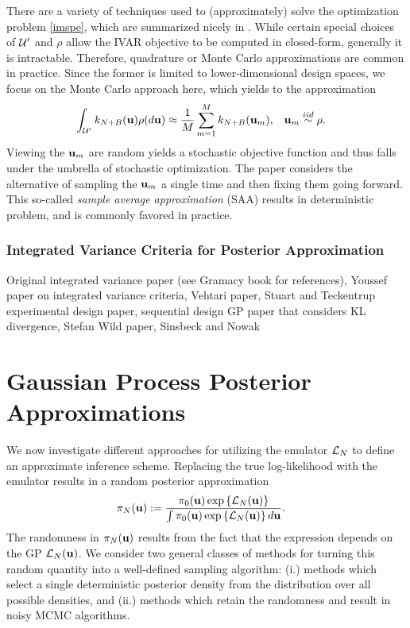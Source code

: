 \documentclass[12pt]{article}
\begin{document}
There are a variety of techniques used to (approximately) solve the optimization problem \ref{imspe}, which are summarized nicely in \cite{Mercer_kernels_IVAR}.
While certain special choices of $\parSpace^\prime$ and $\rho$ allow the IVAR objective to be computed in closed-form, generally it is intractable. Therefore, 
quadrature or Monte Carlo approximations are common in practice. Since the former is limited to lower-dimensional design spaces, we focus on the Monte 
Carlo approach here, which yields to the approximation 
\begin{align}
 \int_{\parSpace^\prime}  \GPKerPred[\Ndesign + \Nbatch](\bpar) \rho(d\bpar) &\approx \frac{1}{M} \sum_{m=1}^{M} \GPKerPred[\Ndesign + \Nbatch](\bpar_m), &&\bpar_m \overset{iid}{\sim} \rho.
\end{align}
Viewing the $\bpar_m$ are random yields a stochastic objective function and thus falls under the umbrella of stochastic optimization. The paper \cite{Mercer_kernels_IVAR} 
considers the alternative of sampling the $\bpar_m$ a single time and then fixing them going forward. This so-called \textit{sample average approximation} (SAA) results 
in deterministic problem, and is commonly favored in practice. 



\subsubsection{Integrated Variance Criteria for Posterior Approximation}


Original integrated variance paper (see Gramacy book for references), Youssef paper on integrated variance criteria, Vehtari paper, Stuart and Teckentrup experimental 
design paper, sequential design GP paper that considers KL divergence, Stefan Wild paper, Sinsbeck and Nowak 

\section{Gaussian Process Posterior Approximations}
We now investigate different approaches for utilizing the emulator $\llik_{\Ndesign}$ to define an approximate inference scheme. Replacing the true log-likelihood 
with the emulator results in a random posterior approximation 
\begin{align}
\postDens_{\Ndesign}(\bpar)
&:= \frac{\priorDens(\bpar) \exp\left\{\llik_{\Ndesign}(\bpar) \right\}}{\int \priorDens(\bpar) \exp\left\{\llik_{\Ndesign}(\bpar) \right\} d\bpar}.
\end{align}
The randomness in $\postDens_{\Ndesign}(\bpar)$ results from the fact that the expression depends on the GP $\llik_{\Ndesign}(\bpar)$. We consider 
two general classes of methods for turning this random quantity into a well-defined sampling algorithm: (i.) methods which select a single deterministic 
posterior density from the distribution over all possible densities, and (ii.) methods which retain the randomness and result in noisy MCMC algorithms. 
\end{document}
